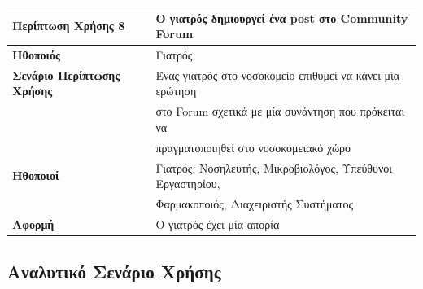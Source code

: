 \documentclass{article}
\newcommand\T{\rule{0pt}{2.6ex}}       %
\newcommand\B{\rule[-1.2ex]{0pt}{0pt}}
\begin{document}
\begin{center}
     \begin{tabular}{|l|l|}
     \hline
      \textbf{Περίπτωση Χρήσης 8} & Ο γιατρός δημιουργεί ένα post στο Community Forum \T\B \\ 
      \hline
      \textbf{Ηθοποιός} & Γιατρός \T\B \\
      \hline
      \textbf{Σενάριο Περίπτωσης Χρήσης} & Ένας γιατρός στο νοσοκομείο επιθυμεί να κάνει μία ερώτηση \T \\& στο Forum σχετικά με μία συνάντηση που πρόκειται να \\& πραγματοποιηθεί στο νοσοκομειακό χώρο \B \\
      \hline
      \textbf{Ηθοποιοί} & Γιατρός, Νοσηλευτής, Μικροβιολόγος, Υπεύθυνοι Εργαστηρίου, \T \\& Φαρμακοποιός, Διαχειριστής Συστήματος \B \\
      \hline
      \textbf{Αφορμή} &  Ο γιατρός έχει μία απορία\T\B \\
      \hline
     \end{tabular}
 \end{center}
 
  \subsection{Αναλυτικό Σενάριο Χρήσης}
\end{document}
